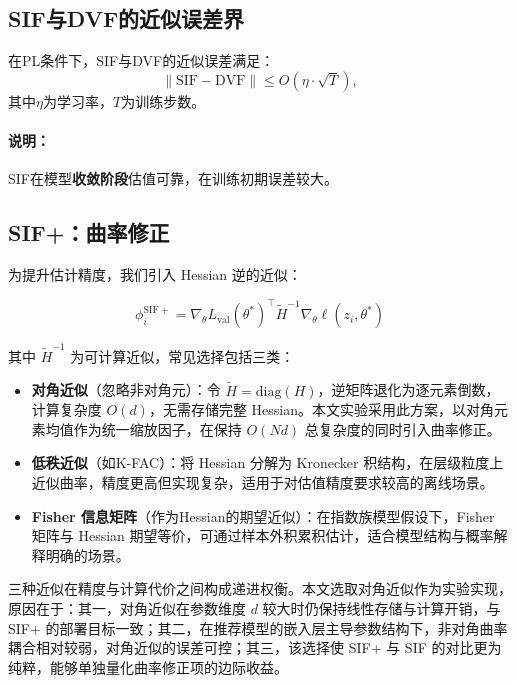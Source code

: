 \subsection{SIF与DVF的近似误差界}
\label{sec:error_bound}

\begin{theorem}[近似误差上界]
在PL条件下，SIF与DVF的近似误差满足：
\[
\| \text{SIF} - \text{DVF} \| \le O(\eta \cdot \sqrt{T}),
\]
其中$\eta$为学习率，$T$为训练步数。
\end{theorem}

\paragraph{说明：}
SIF在模型\textbf{收敛阶段}估值可靠，在训练初期误差较大。

\subsection{SIF+：曲率修正}

为提升估计精度，我们引入 Hessian 逆的近似：

\begin{equation}
\phi_i^{\mathrm{SIF+}} = \nabla_\theta L_{\mathrm{val}}(\theta^*)^\top \tilde{H}^{-1} \nabla_\theta \ell(z_i, \theta^*)
\label{eq:sif_plus}
\end{equation}

其中 \(\tilde{H}^{-1}\) 为可计算近似，常见选择包括三类：

\begin{itemize}
    \item \textbf{对角近似}（忽略非对角元）：令 $\tilde{H} = \mathrm{diag}(H)$，逆矩阵退化为逐元素倒数，计算复杂度 $O(d)$，无需存储完整 Hessian。本文实验采用此方案，以对角元素均值作为统一缩放因子，在保持 $O(Nd)$ 总复杂度的同时引入曲率修正。
    \item \textbf{低秩近似}（如K-FAC）：将 Hessian 分解为 Kronecker 积结构，在层级粒度上近似曲率，精度更高但实现复杂，适用于对估值精度要求较高的离线场景。
    \item \textbf{Fisher 信息矩阵}（作为Hessian的期望近似）：在指数族模型假设下，Fisher 矩阵与 Hessian 期望等价，可通过样本外积累积估计，适合模型结构与概率解释明确的场景。
\end{itemize}

三种近似在精度与计算代价之间构成递进权衡。本文选取对角近似作为实验实现，原因在于：其一，对角近似在参数维度 $d$ 较大时仍保持线性存储与计算开销，与 SIF+ 的部署目标一致；其二，在推荐模型的嵌入层主导参数结构下，非对角曲率耦合相对较弱，对角近似的误差可控；其三，该选择使 SIF+ 与 SIF 的对比更为纯粹，能够单独量化曲率修正项的边际收益。

